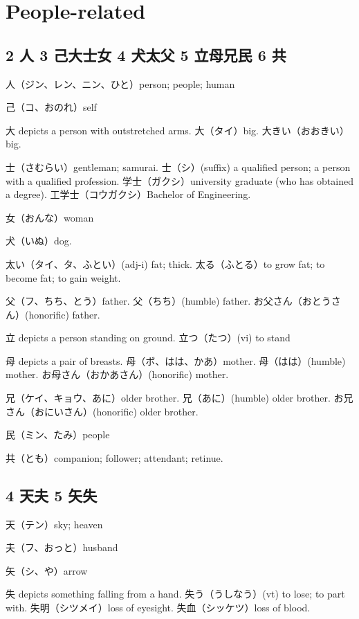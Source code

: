 \section{People-related}

\subsection{2 人 3 己大士女 4 犬太父 5 立母兄民 6 共}

人（ジン、レン、ニン、ひと）person; people; human

己（コ、おのれ）self

大 depicts a person with outstretched arms.
大（タイ）big.
大きい（おおきい）big.

士（さむらい）gentleman; samurai.
士（シ）(suffix)
a qualified person;
a person with a qualified profession.
学士（ガクシ）university graduate (who has obtained a degree).
工学士（コウガクシ）Bachelor of Engineering.

女（おんな）woman

犬（いぬ）dog.

太い（タイ、タ、ふとい）(adj-i) fat; thick.
太る（ふとる）to grow fat; to become fat; to gain weight.

父（フ、ちち、とう）father.
父（ちち）(humble) father.
お父さん（おとうさん）(honorific) father.

立 depicts a person standing on ground.
立つ（たつ）(vi) to stand

母 depicts a pair of breasts.
母（ボ、はは、かあ）mother.
母（はは）(humble) mother.
お母さん（おかあさん）(honorific) mother.

兄（ケイ、キョウ、あに）older brother.
兄（あに）(humble) older brother.
お兄さん（おにいさん）(honorific) older brother.

民（ミン、たみ）people

共（とも）companion; follower; attendant; retinue.

\subsection{4 天夫 5 矢失}

天（テン）sky; heaven

夫（フ、おっと）husband

矢（シ、や）arrow

失 depicts something falling from a hand.
失う（うしなう）(vt) to lose; to part with.
失明（シツメイ）loss of eyesight.
失血（シッケツ）loss of blood.

